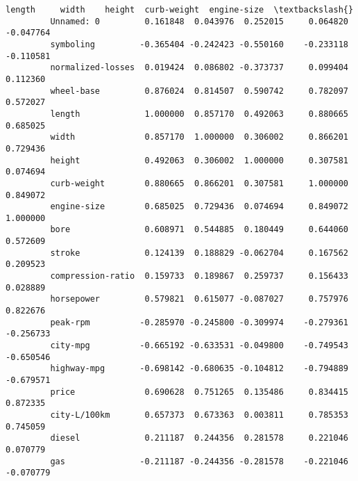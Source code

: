 \documentclass[11pt]{article}
\begin{document}
\begin{Verbatim}[commandchars=\\\{\}]
                              length     width    height  curb-weight  engine-size  \textbackslash{}
         Unnamed: 0         0.161848  0.043976  0.252015     0.064820    -0.047764   
         symboling         -0.365404 -0.242423 -0.550160    -0.233118    -0.110581   
         normalized-losses  0.019424  0.086802 -0.373737     0.099404     0.112360   
         wheel-base         0.876024  0.814507  0.590742     0.782097     0.572027   
         length             1.000000  0.857170  0.492063     0.880665     0.685025   
         width              0.857170  1.000000  0.306002     0.866201     0.729436   
         height             0.492063  0.306002  1.000000     0.307581     0.074694   
         curb-weight        0.880665  0.866201  0.307581     1.000000     0.849072   
         engine-size        0.685025  0.729436  0.074694     0.849072     1.000000   
         bore               0.608971  0.544885  0.180449     0.644060     0.572609   
         stroke             0.124139  0.188829 -0.062704     0.167562     0.209523   
         compression-ratio  0.159733  0.189867  0.259737     0.156433     0.028889   
         horsepower         0.579821  0.615077 -0.087027     0.757976     0.822676   
         peak-rpm          -0.285970 -0.245800 -0.309974    -0.279361    -0.256733   
         city-mpg          -0.665192 -0.633531 -0.049800    -0.749543    -0.650546   
         highway-mpg       -0.698142 -0.680635 -0.104812    -0.794889    -0.679571   
         price              0.690628  0.751265  0.135486     0.834415     0.872335   
         city-L/100km       0.657373  0.673363  0.003811     0.785353     0.745059   
         diesel             0.211187  0.244356  0.281578     0.221046     0.070779   
         gas               -0.211187 -0.244356 -0.281578    -0.221046    -0.070779   
         

\end{Verbatim}
\end{document}
